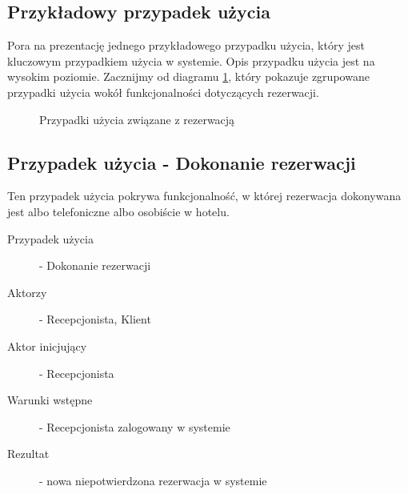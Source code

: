 \documentclass[a4paper,onecolumn,oneside,11pt,wide,floatssmall]{mwrep}
\theoremstyle{definition}
\theoremstyle{plain}%
\theoremstyle{remark}
\begin{document}
\subsection{Przykładowy przypadek użycia}
Pora na prezentację jednego przykładowego przypadku użycia, który jest kluczowym przypadkiem użycia w systemie. Opis przypadku użycia jest na wysokim poziomie. Zacznijmy od diagramu \ref{fig:uc-rezerwacja}, który pokazuje zgrupowane przypadki użycia wokół funkcjonalności dotyczących rezerwacji.

\begin{figure}[H]
  \begin{center}
  \end{center}
  \caption{Przypadki użycia związane z rezerwacją}
  \label{fig:uc-rezerwacja}
\end{figure}

\subsection{Przypadek użycia - Dokonanie rezerwacji}
Ten przypadek użycia pokrywa funkcjonalność, w której rezerwacja dokonywana jest albo telefoniczne albo osobiście w hotelu.
\begin{description}
  \item [Przypadek użycia] - Dokonanie rezerwacji
  \item [Aktorzy] - Recepcjonista, Klient
  \item [Aktor inicjujący] - Recepcjonista
  \item [Warunki wstępne] - Recepcjonista zalogowany w systemie
  \item [Rezultat] - nowa niepotwierdzona rezerwacja w systemie
\end{description}
\end{document}
